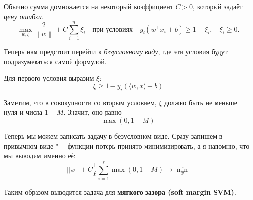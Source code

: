 Обычно сумма домножается на некоторый коэффициент $C > 0$, который задаёт \textit{цену ошибки}.  
\[
\max_{w, \xi} \frac{2}{\|w\|} + C \sum_{i=1}^n \xi_i
\quad \text{при условиях} \quad
y_i (w^\top x_i + b) \ge 1 - \xi_i, \quad \xi_i \ge 0.
\]

Теперь нам предстоит перейти к \textit{безусловному виду}, где эти условия будут подразумеваться самой формулой.

Для первого условия выразим $\xi$:
\[
\xi  \ge 1 - y_i(\langle w, x\rangle + b)
\]

Заметим, что в совокупности со вторым условием, $\xi$ должно быть не меньше нуля и числа $1-M$. Значит, оно равно
\[
\max (0, 1 -M)
\]

Теперь мы можем записать задачу в безусловном виде. Сразу запишем в привычном виде "--- функции потерь принято минимизировать, а я напомню, что мы выводим именно её:
\[
||w|| + C \frac{1}{\ell}\sum_{i=1}^\ell \max (0, 1-M) \rightarrow \min_w
\]

Таким образом выводится задача для \textbf{мягкого зазора (soft margin SVM)}.

